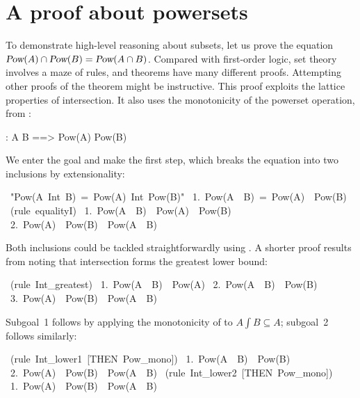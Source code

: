 \section{A proof about powersets}\label{sec:ZF-pow-example}
To demonstrate high-level reasoning about subsets, let us prove the
equation ${\emph{\sl Pow}(A)\cap \emph{\sl Pow}(B)}= \emph{\sl Pow}(A\cap B)$.  Compared
with first-order logic, set theory involves a maze of rules, and theorems
have many different proofs.  Attempting other proofs of the theorem might
be instructive.  This proof exploits the lattice properties of
intersection.  It also uses the monotonicity of the powerset operation,
from :
\begin{isabelle}
:     A \isasymsubseteq B ==> Pow(A) \isasymsubseteq Pow(B)
\end{isabelle}
We enter the goal and make the first step, which breaks the equation into
two inclusions by extensionality:
\begin{isabelle}
\ "Pow(A\ Int\ B)\ =\ Pow(A)\ Int\ Pow(B)"\isanewline
\ 1.\ Pow(A\ \isasyminter \ B)\ =\ Pow(A)\ \isasyminter \ Pow(B)\isanewline
{}\ (rule\ equalityI)\isanewline
\ 1.\ Pow(A\ \isasyminter \ B)\ \isasymsubseteq \ Pow(A)\ \isasyminter \ Pow(B)\isanewline
\ 2.\ Pow(A)\ \isasyminter \ Pow(B)\ \isasymsubseteq \ Pow(A\ \isasyminter \ B)
\end{isabelle}
Both inclusions could be tackled straightforwardly using .
A shorter proof results from noting that intersection forms the greatest
lower bound:
\begin{isabelle}
\ (rule\ Int\_greatest)\isanewline
\ 1.\ Pow(A\ \isasyminter \ B)\ \isasymsubseteq \ Pow(A)\isanewline
\ 2.\ Pow(A\ \isasyminter \ B)\ \isasymsubseteq \ Pow(B)\isanewline
\ 3.\ Pow(A)\ \isasyminter \ Pow(B)\ \isasymsubseteq \ Pow(A\ \isasyminter \ B)
\end{isabelle}
Subgoal~1 follows by applying the monotonicity of  to $A\int
B\subseteq A$; subgoal~2 follows similarly:
\begin{isabelle}
\ (rule\ Int\_lower1\ [THEN\ Pow\_mono])\isanewline
\ 1.\ Pow(A\ \isasyminter \ B)\ \isasymsubseteq \ Pow(B)\isanewline
\ 2.\ Pow(A)\ \isasyminter \ Pow(B)\ \isasymsubseteq \ Pow(A\ \isasyminter \ B)
\isanewline
{}\ (rule\ Int\_lower2\ [THEN\ Pow\_mono])\isanewline
\ 1.\ Pow(A)\ \isasyminter \ Pow(B)\ \isasymsubseteq \ Pow(A\ \isasyminter \ B)
\end{isabelle}
